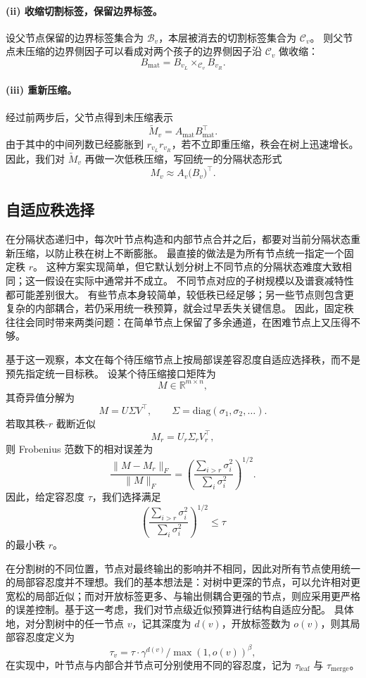 \paragraph{(ii) 收缩切割标签，保留边界标签。}
设父节点保留的边界标签集合为 $\mathcal B_v$，本层被消去的切割标签集合为 $\mathcal C_v$。
则父节点未压缩的边界侧因子可以看成对两个孩子的边界侧因子沿 $\mathcal C_v$ 做收缩：
\[
B_{\mathrm{mat}} = B_{v_L} \times_{\mathcal C_v} B_{v_R}.
\]

\paragraph{(iii) 重新压缩。}
经过前两步后，父节点得到未压缩表示
\[
\widetilde M_v = A_{\mathrm{mat}} B_{\mathrm{mat}}^\top.
\]
由于其中的中间列数已经膨胀到 $r_{v_L} r_{v_R}$，若不立即重压缩，秩会在树上迅速增长。
因此，我们对 $\widetilde M_v$ 再做一次低秩压缩，写回统一的分隔状态形式
\[
M_v \approx A_v \bigl(B_v\bigr)^\top.
\]

\subsection{自适应秩选择}
在分隔状态递归中，每次叶节点构造和内部节点合并之后，都要对当前分隔状态重新压缩，以防止秩在树上不断膨胀。
最直接的做法是为所有节点统一指定一个固定秩 $r$。
这种方案实现简单，但它默认划分树上不同节点的分隔状态难度大致相同；这一假设在实际中通常并不成立。
不同节点对应的子树规模以及谱衰减特性都可能差别很大。
有些节点本身较简单，较低秩已经足够；另一些节点则包含更复杂的内部耦合，若仍采用统一秩预算，就会过早丢失关键信息。
因此，固定秩往往会同时带来两类问题：在简单节点上保留了多余通道，在困难节点上又压得不够。

基于这一观察，本文在每个待压缩节点上按局部误差容忍度自适应选择秩，而不是预先指定统一目标秩。
设某个待压缩接口矩阵为
\[
M \in \mathbb{R}^{m \times n},
\]
其奇异值分解为
\[
M = U \Sigma V^\top,
\qquad
\Sigma = \mathrm{diag}(\sigma_1,\sigma_2,\ldots).
\]
若取其秩-$r$ 截断近似
\[
M_r = U_r \Sigma_r V_r^\top,
\]
则 Frobenius 范数下的相对误差为
\[
\frac{\|M - M_r\|_F}{\|M\|_F}
=
\left(
\frac{\sum_{i>r} \sigma_i^2}{\sum_i \sigma_i^2}
\right)^{1/2}.
\]
因此，给定容忍度 $\tau$，我们选择满足
\[
\left(
\frac{\sum_{i>r} \sigma_i^2}{\sum_i \sigma_i^2}
\right)^{1/2}
\le \tau
\]
的最小秩 $r$。

在分割树的不同位置，节点对最终输出的影响并不相同，因此对所有节点使用统一的局部容忍度并不理想。我们的基本想法是：对树中更深的节点，可以允许相对更宽松的局部近似；而对开放标签更多、与输出侧耦合更强的节点，则应采用更严格的误差控制。基于这一考虑，我们对节点级近似预算进行结构自适应分配。
具体地，对分割树中的任一节点 $v$，记其深度为 $d(v)$，开放标签数为 $o(v)$，则其局部容忍度定义为
\[
\tau_v=\tau \cdot \gamma^{d(v)}\big/\max(1,o(v))^{\beta},
\]
在实现中，叶节点与内部合并节点可分别使用不同的容忍度，记为 $\tau_{\mathrm{leaf}}$ 与 $\tau_{\mathrm{merge}}$。

